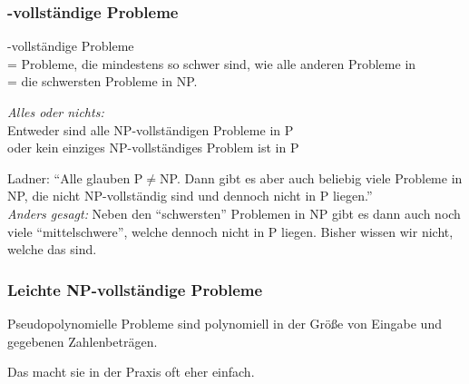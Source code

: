 \documentclass[onlymath]{beamer}
\begin{document}
\maketitle

\begin{frame}\frametitle{-vollständige Probleme}

-vollständige Probleme\\ = Probleme, die mindestens so schwer
sind, wie alle anderen Probleme in \\
= die schwersten Probleme in NP.
\bigskip

\emph{Alles oder nichts:}\\
Entweder sind alle NP-vollständigen Probleme in P\\
oder kein einziges NP-vollständiges Problem ist in P
\bigskip\pause

\alert{Ladner:} "`Alle glauben P${}\neq{}$NP. Dann gibt es aber auch 
beliebig viele Probleme in NP, die nicht NP-vollständig sind und dennoch nicht in P liegen."'
\\
\medskip
\emph{Anders gesagt:} Neben den "`schwersten"' Problemen in NP gibt es dann auch noch viele "`mittelschwere"', welche dennoch nicht in P liegen. Bisher wissen wir nicht, welche das
sind.

\end{frame}

\begin{frame}\frametitle{Leichte NP-vollständige Probleme}

Pseudopolynomielle Probleme sind polynomiell in der Größe von
Eingabe und gegebenen Zahlenbeträgen.
\bigskip

Das macht sie in der Praxis oft eher einfach.
\bigskip


\end{frame}

\end{document}
